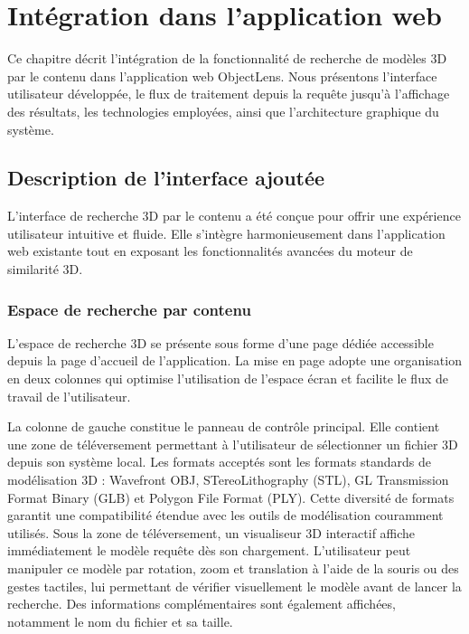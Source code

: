 \documentclass[11pt,a4paper,oneside]{report}
\begin{document}

\chapter{Intégration dans l’application web}

Ce chapitre décrit l'intégration de la fonctionnalité de recherche de modèles 3D par le contenu dans l'application web ObjectLens. Nous présentons l'interface utilisateur développée, le flux de traitement depuis la requête jusqu'à l'affichage des résultats, les technologies employées, ainsi que l'architecture graphique du système.

\section{Description de l'interface ajoutée}

L'interface de recherche 3D par le contenu a été conçue pour offrir une expérience utilisateur intuitive et fluide. Elle s'intègre harmonieusement dans l'application web existante tout en exposant les fonctionnalités avancées du moteur de similarité 3D.

\subsection{Espace de recherche par contenu}

L'espace de recherche 3D se présente sous forme d'une page dédiée accessible depuis la page d'accueil de l'application. La mise en page adopte une organisation en deux colonnes qui optimise l'utilisation de l'espace écran et facilite le flux de travail de l'utilisateur.

La colonne de gauche constitue le panneau de contrôle principal. Elle contient une zone de téléversement permettant à l'utilisateur de sélectionner un fichier 3D depuis son système local. Les formats acceptés sont les formats standards de modélisation 3D : Wavefront OBJ, STereoLithography (STL), GL Transmission Format Binary (GLB) et Polygon File Format (PLY). Cette diversité de formats garantit une compatibilité étendue avec les outils de modélisation couramment utilisés. Sous la zone de téléversement, un visualiseur 3D interactif affiche immédiatement le modèle requête dès son chargement. L'utilisateur peut manipuler ce modèle par rotation, zoom et translation à l'aide de la souris ou des gestes tactiles, lui permettant de vérifier visuellement le modèle avant de lancer la recherche. Des informations complémentaires sont également affichées, notamment le nom du fichier et sa taille.
\end{document}
